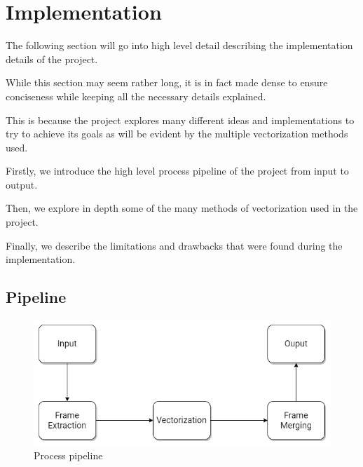 \documentclass[12pt]{article}
\newcommand{\sentence}{} %
\begin{document}
    \pagebreak


    \section{Implementation}\label{sec:implementation}

    \tab
    The following section will go into high level detail describing the implementation details of the project.
    \sentence
    While this section may seem rather long, it is in fact made dense to ensure conciseness while keeping all the
    necessary details explained.
    \sentence
    This is because the project explores many different ideas and implementations to try to achieve its goals as will
    be evident by the multiple vectorization methods used.
    \sentence
    Firstly, we introduce the high level process pipeline of the project from input to output.
    \sentence
    Then, we explore in depth some of the many methods of vectorization used in the project.
    \sentence
    Finally, we describe the limitations and drawbacks that were found during the implementation.

    \subsection{Pipeline}\label{subsec:pipeline}

    \begin{figure}[h]
        \centering
        \includegraphics[width=\textwidth]{Pipeline.png}
        \caption[Pipeline]{Process pipeline}
        \label{fig:pipeline}
    \end{figure}

    \bigskip
\end{document}
